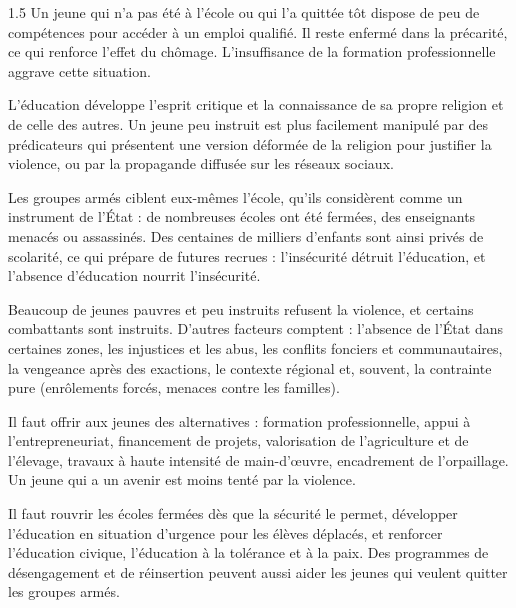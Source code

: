 \documentclass[12pt]{article}
\begin{document}
\begin{spacing}{1.5}
Un jeune qui n'a pas été à l'école ou qui l'a quittée tôt dispose de peu de compétences pour accéder à un emploi qualifié. Il reste enfermé dans la précarité, ce qui renforce l'effet du chômage. L'insuffisance de la formation professionnelle aggrave cette situation.

L'éducation développe l'esprit critique et la connaissance de sa propre religion et de celle des autres. Un jeune peu instruit est plus facilement manipulé par des prédicateurs qui présentent une version déformée de la religion pour justifier la violence, ou par la propagande diffusée sur les réseaux sociaux.

Les groupes armés ciblent eux-mêmes l'école, qu'ils considèrent comme un instrument de l'État : de nombreuses écoles ont été fermées, des enseignants menacés ou assassinés. Des centaines de milliers d'enfants sont ainsi privés de scolarité, ce qui prépare de futures recrues : l'insécurité détruit l'éducation, et l'absence d'éducation nourrit l'insécurité.



Beaucoup de jeunes pauvres et peu instruits refusent la violence, et certains combattants sont instruits. D'autres facteurs comptent : l'absence de l'État dans certaines zones, les injustices et les abus, les conflits fonciers et communautaires, la vengeance après des exactions, le contexte régional et, souvent, la contrainte pure (enrôlements forcés, menaces contre les familles).

Il faut offrir aux jeunes des alternatives : formation professionnelle, appui à l'entrepreneuriat, financement de projets, valorisation de l'agriculture et de l'élevage, travaux à haute intensité de main-d'œuvre, encadrement de l'orpaillage. Un jeune qui a un avenir est moins tenté par la violence.

Il faut rouvrir les écoles fermées dès que la sécurité le permet, développer l'éducation en situation d'urgence pour les élèves déplacés, et renforcer l'éducation civique, l'éducation à la tolérance et à la paix. Des programmes de désengagement et de réinsertion peuvent aussi aider les jeunes qui veulent quitter les groupes armés.


\end{spacing}
\end{document}
